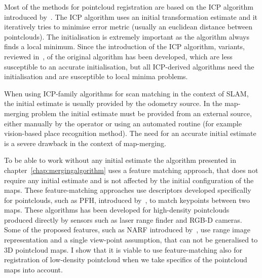 Most of the methods for pointcloud registration are based on the \gls{ICP} algorithm introduced by~\citet{besl1992icp}. The \gls{ICP} algorithm uses an initial transformation estimate and it iteratively tries to minimise error metric (usually an euclidean distance between pointclouds). The initialisation is extremely important as the algorithm always finds a local minimum. Since the introduction of the \gls{ICP} algorithm, variants, reviewed in~\citet{pomerleau2015reviewregistration}, of the original algorithm has been developed, which are less susceptible to an accurate initialisation, but all \gls{ICP}-derived algorithms need the initialisation and are susceptible to local minima problems.

When using \gls{ICP}-family algorithms for scan matching in the context of \gls{SLAM}, the initial estimate is usually provided by the odometry source. In the map-merging problem the initial estimate must be provided from an external source, either manually by the operator or using an automated routine (for example vision-based place recognition method). The need for an accurate initial estimate is a severe drawback in the context of map-merging.

To be able to work without any initial estimate the algorithm presented in chapter~\ref{chap:mergingalgorithm} uses a feature matching approach, that does not require any initial estimate and is not affected by the initial configuration of the maps. These feature-matching approaches use descriptors developed specifically for pointclouds, such as \gls{PFH}, introduced by~\citet{rusu2008pfh}, to match keypoints between two maps. These algorithms has been developed for high-density pointclouds produced directly by sensors such as laser range finder and \gls{RGB-D} cameras. Some of the proposed features, such as \gls{NARF} introduced by~\citet{steder2010narf}, use range image representation and a single view-point assumption, that can not be generalised to \gls{3D} pointcloud maps. I show that it is viable to use feature-matching also for registration of low-density pointcloud when we take specifics of the pointcloud maps into account.
